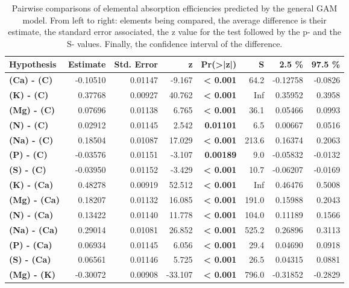 \begin{table}[H]
\centering
\caption{\label{supptable:table_pairs_i_ae} Pairwise comparisons of elemental absorption efficiencies predicted by the general GAM model. From left to right: elements being compared, the average difference is their estimate, the standard error associated, the z value for the test followed by the p- and the S- values. Finally, the confidence interval of the difference.}
\centering
\begin{tabular}[t]{>{}lrrr>{}rrrr}
\toprule
\textbf{ Hypothesis  } & \textbf{ Estimate } & \textbf{ Std. Error } & \textbf{ z       } & \textbf{ Pr(>|z|) } & \textbf{ S      } & \textbf{ 2.5 \%    } & \textbf{ 97.5 \%  }\\
\midrule
\textbf{(Ca) - (C)} & -0.10510 & 0.01147 & -9.167 & \textbf{< 0.001} & 64.2 & -0.12758 & -0.0826\\
\textbf{(K) - (C)} & 0.37768 & 0.00927 & 40.762 & \textbf{< 0.001} & Inf & 0.35952 & 0.3958\\
\textbf{(Mg) - (C)} & 0.07696 & 0.01138 & 6.765 & \textbf{< 0.001} & 36.1 & 0.05466 & 0.0993\\
\textbf{(N) - (C)} & 0.02912 & 0.01145 & 2.542 & \textbf{0.01101} & 6.5 & 0.00667 & 0.0516\\
\textbf{(Na) - (C)} & 0.18504 & 0.01087 & 17.029 & \textbf{< 0.001} & 213.6 & 0.16374 & 0.2063\\
\textbf{(P) - (C)} & -0.03576 & 0.01151 & -3.107 & \textbf{0.00189} & 9.0 & -0.05832 & -0.0132\\
\textbf{(S) - (C)} & -0.03950 & 0.01152 & -3.429 & \textbf{< 0.001} & 10.7 & -0.06207 & -0.0169\\
\textbf{(K) - (Ca)} & 0.48278 & 0.00919 & 52.512 & \textbf{< 0.001} & Inf & 0.46476 & 0.5008\\
\textbf{(Mg) - (Ca)} & 0.18207 & 0.01132 & 16.085 & \textbf{< 0.001} & 191.0 & 0.15988 & 0.2043\\
\textbf{(N) - (Ca)} & 0.13422 & 0.01140 & 11.778 & \textbf{< 0.001} & 104.0 & 0.11189 & 0.1566\\
\textbf{(Na) - (Ca)} & 0.29014 & 0.01081 & 26.852 & \textbf{< 0.001} & 525.2 & 0.26896 & 0.3113\\
\textbf{(P) - (Ca)} & 0.06934 & 0.01145 & 6.056 & \textbf{< 0.001} & 29.4 & 0.04690 & 0.0918\\
\textbf{(S) - (Ca)} & 0.06561 & 0.01146 & 5.725 & \textbf{< 0.001} & 26.5 & 0.04315 & 0.0881\\
\textbf{(Mg) - (K)} & -0.30072 & 0.00908 & -33.107 & \textbf{< 0.001} & 796.0 & -0.31852 & -0.2829\\

\end{tabular}
\end{table}
